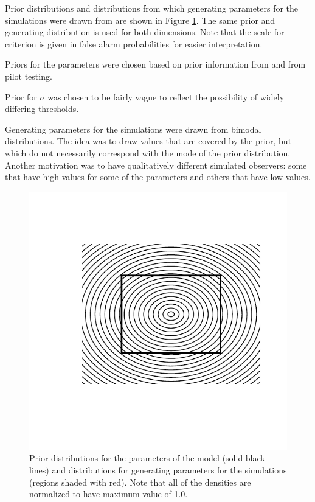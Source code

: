 \documentclass{article}\usepackage{knitr}
\begin{document}
Prior distributions and distributions from which generating parameters for the simulations were drawn from are shown in Figure \ref{fig:priors}. The same prior and generating distribution is used for both dimensions. Note that the scale for criterion is given in false alarm probabilities for easier interpretation. 

Priors for the parameters were chosen based on prior information from \citet{silbert2009} and from pilot testing. 

Prior for $\sigma$ was chosen to be fairly vague to reflect the possibility of widely differing thresholds.

Generating parameters for the simulations were drawn from bimodal distributions. The idea was to draw values that are covered by the prior, but which do not necessarily correspond with the mode of the prior distribution. Another motivation was to have qualitatively different simulated observers: some that have high values for some of the parameters and others that have low values.

\begin{figure}
\centering
\begin{knitrout}
\color{fgcolor}
\includegraphics[width=\maxwidth]{figure/unnamed-chunk-2-1} 

\end{knitrout}

\caption{Prior distributions for the parameters of the model (solid black lines) and distributions for generating parameters for the simulations (regions shaded with red). Note that all of the densities are normalized to have maximum value of 1.0.}
\label{fig:priors}
\end{figure}
\end{document}
